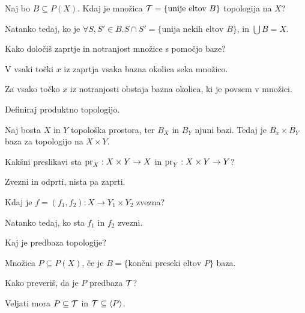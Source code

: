 \begin{vo}{Naj bo $B \subseteq P(X)$. Kdaj je množica
  $\mathcal{T} = \{ \text{unije eltov $B$} \}$ topologija na $X$?}

Natanko tedaj, ko je $\forall S, S' \in B . S \cap S' =
\{ \text{unija nekih eltov $B$} \}$, in $\bigcup B = X$.

\end{vo}

\begin{vo}{Kako določiš zaprtje in notranjost množice s pomočjo baze?}

V vsaki točki $x$ iz zaprtja vsaka bazna okolica seka množico.

Za vsako točko $x$ iz notranjosti obstaja bazna okolica, ki je povsem v množici.

\end{vo}

\begin{vo}{Definiraj produktno topologijo.}

Naj bosta $X$ in $Y$ topološka prostora, ter $B_X$ in $B_Y$ njuni bazi.
Tedaj je $B_x \times B_Y$ baza za topologijo na $X \times Y$.

\end{vo}

\begin{vo}{Kakšni preslikavi sta $\text{\normalfont pr}_X : X \times Y \to X$
  in $\text{\normalfont pr}_Y : X \times Y \to Y$?}

Zvezni in odprti, nista pa zaprti.

\end{vo}

\begin{vo}{Kdaj je $f = (f_1, f_2) : X \to Y_1 \times Y_2$ zvezna?}

Natanko tedaj, ko sta $f_1$ in $f_2$ zvezni.

\end{vo}

\begin{vo}{Kaj je predbaza topologije?}

Množica $P \subseteq P(X)$, če je $B = \{ \text{končni preseki eltov $P$} \}$
baza.

\end{vo}

\begin{vo}{Kako preveriš, da je $P$ predbaza $\mathcal{T}$?}

Veljati mora $P \subseteq \mathcal{T}$ in $\mathcal{T} \subseteq \left<P\right>$.

\end{vo}

